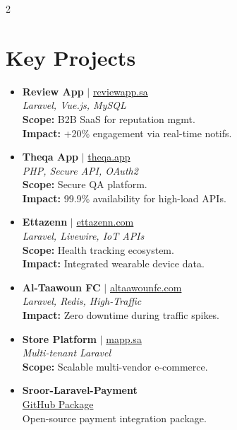 \documentclass[10pt, a4paper]{article}
\begin{document}
\begin{paracol}{2}
\section{Key Projects}
\begin{itemize}[leftmargin=0.15in, label={}]
    \item \textbf{Review App} $|$ \href{https://reviewapp.sa/}{reviewapp.sa} \\
    \footnotesize \textit{Laravel, Vue.js, MySQL} \\
    \textbf{Scope:} B2B SaaS for reputation mgmt. \\
    \textbf{Impact:} +20\% engagement via real-time notifs.
    \vspace{6pt}
    
    \item \textbf{Theqa App} $|$ \href{https://theqa.app/}{theqa.app} \\
    \footnotesize \textit{PHP, Secure API, OAuth2} \\
    \textbf{Scope:} Secure QA platform. \\
    \textbf{Impact:} 99.9\% availability for high-load APIs.
    \vspace{6pt}

    \item \textbf{Ettazenn} $|$ \href{https://ettazenn.com/}{ettazenn.com} \\
    \footnotesize \textit{Laravel, Livewire, IoT APIs} \\
    \textbf{Scope:} Health tracking ecosystem. \\
    \textbf{Impact:} Integrated wearable device data.
    \vspace{6pt}

    \item \textbf{Al-Taawoun FC} $|$ \href{https://altaawounfc.com/}{altaawounfc.com} \\
    \footnotesize \textit{Laravel, Redis, High-Traffic} \\
    \textbf{Impact:} Zero downtime during traffic spikes.
    \vspace{6pt}

    \item \textbf{Store Platform} $|$ \href{https://mapp.sa/}{mapp.sa} \\
    \footnotesize \textit{Multi-tenant Laravel} \\
    \textbf{Scope:} Scalable multi-vendor e-commerce.
    \vspace{4pt}
    
    \item \textbf{Sroor-Laravel-Payment} \\
    \footnotesize \href{https://github.com/Kamalsroor/sroor-laravel-payment}{GitHub Package} \\
    Open-source payment integration package.
\end{itemize}


\end{paracol}
\end{document}
